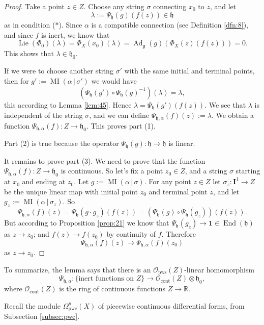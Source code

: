 \documentclass[10pt, a4paper]{amsart}
\theoremstyle{definition}
\numberwithin{equation}{section}
\newcommand{\opn}{\operatorname}
\newcommand{\mfrak}[1]{\mathfrak{#1}}
\newcommand{\mcal}[1]{\mathcal{#1}}
\newcommand{\mbf}[1]{\mathbf{#1}}
\newcommand{\mrm}[1]{\mathrm{#1}}
\newcommand{\mbb}[1]{\mathbb{#1}}
\newcommand{\bsym}[1]{\boldsymbol{#1}}
\renewcommand{\vert}{\, | \,}
\newcommand{\R}{\mbb{R}}
\newcommand{\g}{\mfrak{g}}
\newcommand{\h}{\mfrak{h}}
\newcommand{\lb}{\linebreak}
\begin{document}
\begin{proof}
Take a point $z \in Z$. Choose any string $\sigma$ connecting $x_0$ to $z$,
and let 
\[ \lambda  := \Psi_{\h}(g)(f(z)) \in \h \]
as in condition ($*$). Since $\alpha$ is a compatible connection 
(see Definition \ref{dfn:8}), and since $f$ is inert, we know that 
\[ \opn{Lie}(\Phi_0)(\lambda) = \Phi_X(x_0)(\lambda) = 
\opn{Ad}_{\g}(g)(\Phi_X(z)(f(z))) = 0 . \]
This shows that $\lambda \in \h_0$. 

If we were to choose another string $\sigma'$ with the same initial and terminal
points, then for 
$g' := \opn{MI}(\alpha \vert \sigma')$ we would have
\[ (\Psi_{\h}(g') \circ \Psi_{\h}(g)^{-1})(\lambda) = \lambda , \]
this according to Lemma \ref{lem:45}.
Hence $\lambda =  \Psi_{\h}(g')(f(z))$. 
We see that $\lambda$ is independent of the string $\sigma$, and 
we can define 
$\Psi_{\h, \alpha}(f)(z) := \lambda$.
We obtain a function $\Psi_{\h, \alpha}(f) : Z \to \h_0$.
This proves part (1). 

Part (2) is true because the operator $\Psi_{\h}(g) : \h \to \h$ is linear.

It remains to prove part (3). We need to prove that the function \lb 
$\Psi_{\h, \alpha}(f) : Z \to \h_0$ is continuous. So let's fix a point
$z_0 \in Z$, and a string $\sigma$ starting at $x_0$ and ending at $z_0$. Let
$g := \opn{MI}(\alpha \vert \sigma)$.
For any point $z \in Z$ let $\sigma_z : \mbf{I}^1 \to Z$ be the unique linear
map with initial point $z_0$ and terminal point $z$, and let
$g_z := \opn{MI}(\alpha \vert \sigma_z)$. So
\[ \Psi_{\h, \alpha}(f)(z) = \Psi_{\h}(g \cdot g_z)(f(z)) 
=  (\Psi_{\h}(g) \circ \Psi_{\h}(g_z))(f(z)) . \]
But according to Proposition \ref{prop:21} we know that 
$\Psi_{\h}(g_z) \to \bsym{1} \in \opn{End}(\h)$ as $z \to z_0$;
and $f(z) \to f(z_0)$ by continuity of $f$. 
Therefore 
\[ \Psi_{\h, \alpha}(f)(z) \to \Psi_{\h, \alpha}(f)(z_0) \] 
as $z \to z_0$.
\end{proof}

To summarize, the lemma says that there is an 
$\mcal{O}_{\mrm{pws}}(Z)$-linear homomorphism
\begin{equation} \label{eqn:224}
\Psi_{\h, \alpha} : \{ \text{inert functions on } Z \} 
\to \mcal{O}_{\mrm{cont}}(Z) \otimes \h_0 ,
\end{equation}
where $\mcal{O}_{\mrm{cont}}(Z)$ is the ring of continuous functions 
$Z \to \R$. 

Recall the module $\Omega^p_{\mrm{pwc}}(X)$ of piecewise continuous
differential forms, from Subsection \ref{subsec:pwc}.
\end{document}
